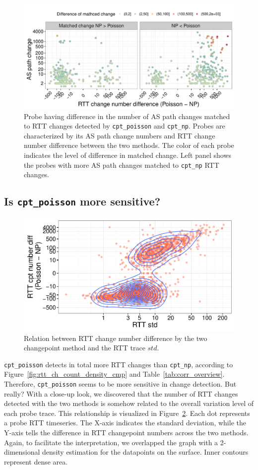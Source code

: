 \begin{figure}[!htb]
\centering
\includegraphics[width=.96\textwidth]{gfx/chap4/as_match_diff.pdf}
\caption{Probe having difference in the number of AS path changes matched to RTT changes detected by \texttt{cpt\_poisson} and \texttt{cpt\_np}. Probes are characterized by its AS path change numbers and RTT change number difference between the two methods. The color of each probe indicates the level of difference in matched change. Left panel shows the probes with more AS path changes matched to \texttt{cpt\_np} RTT changes.}
\label{fig:as_match_diff}
\end{figure}


\subsection{Is \texttt{cpt\_poisson} more sensitive?}
\label{sec:over_sensitive}
\begin{figure}[!htb]
\centering
\includegraphics[width=.64\textwidth]{gfx/chap4/cpt_diff_vs_std.pdf}
\caption{Relation between RTT change number difference by the two changepoint method and the RTT trace $std$.}
\label{fig:cpt_diff_vs_std}
\end{figure}

\texttt{cpt\_poisson} detects in total more RTT changes than \texttt{cpt\_np}, according to Figure~\ref{fig:rtt_ch_count_density_cmp} and Table~\ref{tab:corr_overview}.
Therefore, \texttt{cpt\_poisson} seems to be more sensitive in change detection. But really?
With a close-up look, we discovered that the number of RTT changes detected with the two methods is somehow related to the overall variation level of each probe trace.
This relationship is visualized in Figure~\ref{fig:cpt_diff_vs_std}.
Each dot represents a probe RTT timeseries. 
The X-axis indicates the standard deviation, while the Y-axis tells the difference in RTT changepoint numbers across the two methods.
Again, to facilitate the interpretation, we overlapped the graph with a 2-dimensional density estimation for the datapoints on the surface. Inner contours represent dense area.


